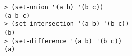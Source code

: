 \begin{verbatim}
> (set-union '(a b) '(b c))
(a b c)
> (set-intersection '(a b) '(b c))
(b)
> (set-difference '(a b) '(b c))
(a)
\end{verbatim}
